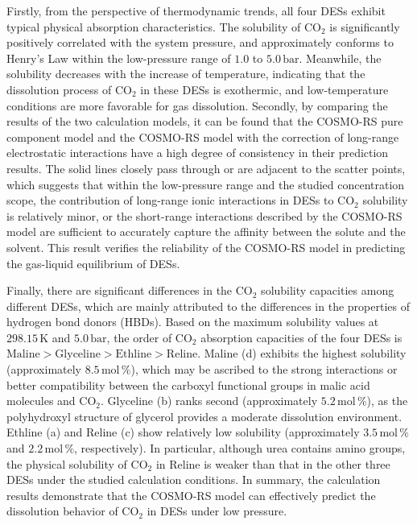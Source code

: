 \documentclass[AMA,LATO2COL]{WileyNJDv5} %
\begin{document}
Firstly, from the perspective of thermodynamic trends, all four DESs exhibit typical physical absorption characteristics. The solubility of $\mathrm{CO}_2$ is significantly positively correlated with the system pressure, and approximately conforms to Henry's Law within the low-pressure range of $1.0$ to $5.0\,\mathrm{bar}$. Meanwhile, the solubility decreases with the increase of temperature, indicating that the dissolution process of $\mathrm{CO}_2$ in these DESs is exothermic, and low-temperature conditions are more favorable for gas dissolution. Secondly, by comparing the results of the two calculation models, it can be found that the COSMO-RS pure component model and the COSMO-RS model with the correction of long-range electrostatic interactions have a high degree of consistency in their prediction results. The solid lines closely pass through or are adjacent to the scatter points, which suggests that within the low-pressure range and the studied concentration scope, the contribution of long-range ionic interactions in DESs to $\mathrm{CO}_2$ solubility is relatively minor, or the short-range interactions described by the COSMO-RS model are sufficient to accurately capture the affinity between the solute and the solvent. This result verifies the reliability of the COSMO-RS model in predicting the gas-liquid equilibrium of DESs.

Finally, there are significant differences in the $\mathrm{CO}_2$ solubility capacities among different DESs, which are mainly attributed to the differences in the properties of hydrogen bond donors (HBDs). Based on the maximum solubility values at $298.15\,\mathrm{K}$ and $5.0\,\mathrm{bar}$, the order of $\mathrm{CO}_2$ absorption capacities of the four DESs is $\mathrm{Maline} > \mathrm{Glyceline} > \mathrm{Ethline} > \mathrm{Reline}$. Maline (d) exhibits the highest solubility (approximately $8.5\,\mathrm{mol}\,\%$), which may be ascribed to the strong interactions or better compatibility between the carboxyl functional groups in malic acid molecules and $\mathrm{CO}_2$. Glyceline (b) ranks second (approximately $5.2\,\mathrm{mol}\,\%$), as the polyhydroxyl structure of glycerol provides a moderate dissolution environment. Ethline (a) and Reline (c) show relatively low solubility (approximately $3.5\,\mathrm{mol}\,\%$ and $2.2\,\mathrm{mol}\,\%$, respectively). In particular, although urea contains amino groups, the physical solubility of $\mathrm{CO}_2$ in Reline is weaker than that in the other three DESs under the studied calculation conditions. In summary, the calculation results demonstrate that the COSMO-RS model can effectively predict the dissolution behavior of $\mathrm{CO}_2$ in DESs under low pressure.
\end{document}
